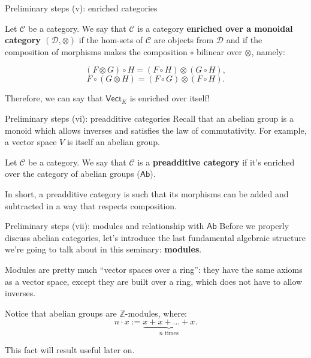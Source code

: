 \documentclass{beamer}
\newcommand{\ZZ}{\mathbb{Z}}
\newcommand{\cat}[1]{\mathsf{#1}}
\begin{document}
\begin{frame}{Preliminary steps (v): enriched categories}
    \begin{definition}
        Let $\mathcal{C}$ be a category. We say that $\mathcal{C}$
        is a category \textbf{enriched over a monoidal category $(\mathcal{D}, \otimes)$}
        if the hom-sets of $\mathcal{C}$ are objects from
        $\mathcal{D}$ and if the composition of morphisms makes
        the composition $\circ$ bilinear over $\otimes$, namely:

        \[
            (F \otimes G) \circ H = (F \circ H) \otimes (G \circ H),
        \]
        \[
            F \circ (G \otimes H) = (F \circ G) \otimes (F \circ H).
        \]
    \end{definition}

    Therefore, we can say that $\cat{Vect}_K$ is enriched over itself!
\end{frame}

\begin{frame}{Preliminary steps (vi): preadditive categories}
    Recall that an abelian group is a monoid which allows inverses
    and satisfies the law of commutativity. For example, a vector
    space $V$ is itself an abelian group. \medskip

    \begin{definition}
        Let $\mathcal{C}$ be a category. We say that $\mathcal{C}$
        is a \textbf{preadditive category} if it's enriched
        over the category of abelian groups ($\cat{Ab}$).
    \end{definition} \smallskip

    In short, a preadditive category is such that its morphisms can
    be added and subtracted in a way that respects composition.
\end{frame}

\begin{frame}{Preliminary steps (vii): modules and relationship with $\cat{Ab}$}
    Before we properly discuss abelian categories, let's introduce
    the last fundamental algebraic structure we're going to talk about
    in this seminary: \textbf{modules}. \medskip
    
    Modules are pretty much ``vector spaces over a ring'': they have the
    same axioms as a vector space, except they are built over a ring,
    which does not have to allow inverses. \medskip

    Notice that abelian groups are $\ZZ$-modules, where:
    \[
        n \cdot x := \underbrace{x + x + \ldots + x}_{n \text{ times}}.
    \]

    This fact will result useful later on.
\end{frame}
\end{document}
